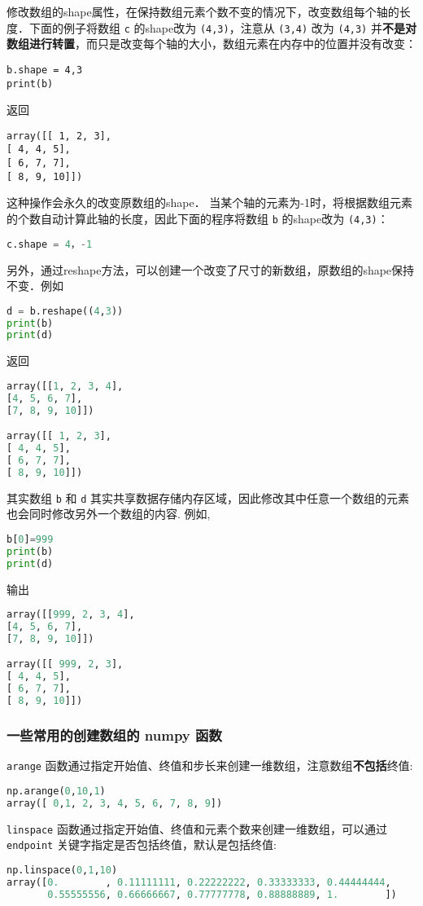 修改数组的shape属性，在保持数组元素个数不变的情况下，改变数组每个轴的长度．下面的例子将数组 \verb|c| 的shape改为 \verb|(4,3)|，注意从 \verb|(3,4)| 改为 \verb|(4,3)| 并\textbf{不是对数组进行转置}，而只是改变每个轴的大小，数组元素在内存中的位置并没有改变：
\begin{lstlisting}
b.shape = 4,3
print(b)
\end{lstlisting}
返回
\begin{lstlisting}
array([[ 1, 2, 3],
[ 4, 4, 5],
[ 6, 7, 7],
[ 8, 9, 10]])
\end{lstlisting}
这种操作会永久的改变原数组的shape． 当某个轴的元素为-1时，将根据数组元素的个数自动计算此轴的长度，因此下面的程序将数组 \verb|b| 的shape改为 \verb|(4,3)|：
\begin{lstlisting}[language=python]
c.shape = 4，-1
\end{lstlisting}
另外，通过reshape方法，可以创建一个改变了尺寸的新数组，原数组的shape保持不变．例如
\begin{lstlisting}[language=python]
d = b.reshape((4,3))
print(b)
print(d)
\end{lstlisting}
返回
\begin{lstlisting}[language=python]
array([[1, 2, 3, 4],
[4, 5, 6, 7],
[7, 8, 9, 10]])

array([[ 1, 2, 3],
[ 4, 4, 5],
[ 6, 7, 7],
[ 8, 9, 10]])
\end{lstlisting}
其实数组 \verb|b| 和 \verb|d| 其实共享数据存储内存区域，因此修改其中任意一个数组的元素也会同时修改另外一个数组的内容. 例如,
\begin{lstlisting}[language=python]
b[0]=999
print(b)
print(d)
\end{lstlisting}
输出
\begin{lstlisting}[language=python]
array([[999, 2, 3, 4],
[4, 5, 6, 7],
[7, 8, 9, 10]])

array([[ 999, 2, 3],
[ 4, 4, 5],
[ 6, 7, 7],
[ 8, 9, 10]])
\end{lstlisting}


\subsubsection{一些常用的创建数组的 numpy 函数}
\verb|arange| 函数通过指定开始值、终值和步长来创建一维数组，注意数组\textbf{不包括}终值:
\begin{lstlisting}[language=python]
np.arange(0,10,1)
array([ 0,1, 2, 3, 4, 5, 6, 7, 8, 9])
\end{lstlisting}

\verb|linspace| 函数通过指定开始值、终值和元素个数来创建一维数组，可以通过 \verb|endpoint| 关键字指定是否包括终值，默认是包括终值:
 \begin{lstlisting}[language=python]
np.linspace(0,1,10)
array([0.        , 0.11111111, 0.22222222, 0.33333333, 0.44444444,
       0.55555556, 0.66666667, 0.77777778, 0.88888889, 1.        ])
 \end{lstlisting}

